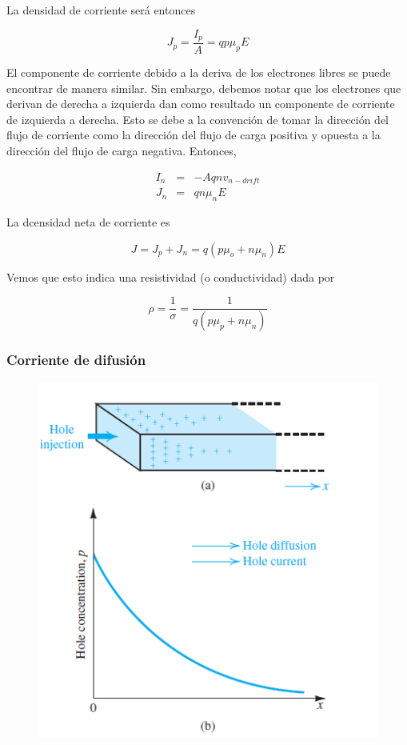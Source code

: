 La densidad de corriente será entonces

\begin{equation*}
J_p =\frac{I_p}{A} = q p \mu_p E
\end{equation*}

El componente de corriente debido a la deriva de los electrones libres se puede encontrar de manera similar. Sin embargo, debemos notar que los electrones que derivan de derecha a izquierda dan como resultado un componente de corriente de izquierda a derecha. Esto se debe a la convención de tomar la dirección del flujo de corriente como la dirección del flujo de carga positiva y opuesta a la dirección del flujo de carga negativa. Entonces,

\begin{eqnarray*}
I_n &=& -A q n v_{n-drift} \\
J_n &=& q n \mu_n E
\end{eqnarray*}

La dcensidad neta de corriente es

\begin{equation*}
J = J_p + J_n = q (p \mu_o + n \mu_n) E
\end{equation*}

Vemos que esto indica una resistividad (o conductividad) dada por 

\begin{equation*}
\rho = \frac{1}{\sigma} = \frac{1}{q(p \mu_p + n \mu_n)}
\end{equation*}

\subsubsection{Corriente de difusión}

\begin{figure}[H]
    \centering
    \includegraphics[scale=0.6]{Electronica/semiconductor_f2.png}
\end{figure}

